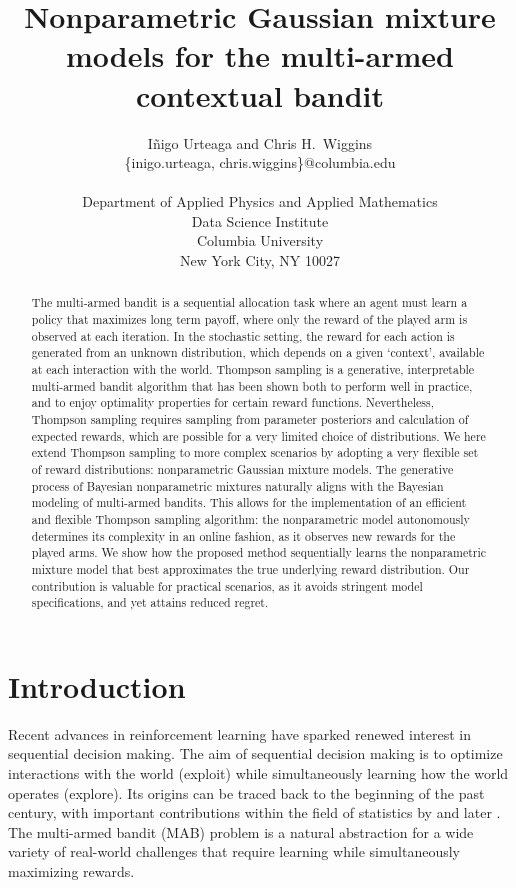 \documentclass{article}
\title{Nonparametric Gaussian mixture models for the multi-armed contextual bandit}
\author{ I\~{n}igo Urteaga and Chris H.~Wiggins\\
	{\sf \{inigo.urteaga, chris.wiggins\}@columbia.edu} \\\\
	Department of	Applied Physics and Applied Mathematics\\
	Data Science Institute\\
	Columbia University\\
	New York City, NY 10027
}
\begin{document}
\maketitle

\begin{abstract}
The multi-armed bandit is a sequential allocation task where an agent must learn a policy that maximizes long term payoff, where only the reward of the played arm is observed at each iteration. In the stochastic setting, the reward for each action is generated from an unknown distribution, which depends on a given `context', available at each interaction with the world. Thompson sampling is a generative, interpretable multi-armed bandit algorithm that has been shown both to perform well in practice, and to enjoy optimality properties for certain reward functions. Nevertheless, Thompson sampling requires sampling from parameter posteriors and calculation of expected rewards, which are possible for a very limited choice of distributions. We here extend Thompson sampling to more complex scenarios by adopting a very flexible set of reward distributions: nonparametric Gaussian mixture models. The generative process of Bayesian nonparametric mixtures naturally aligns with the Bayesian modeling of multi-armed bandits. This allows for the implementation of an efficient and flexible Thompson sampling algorithm: the nonparametric model autonomously determines its complexity in an online fashion, as it observes new rewards for the played arms. We show how the proposed method sequentially learns the nonparametric mixture model that best approximates the true underlying reward distribution. Our contribution is valuable for practical scenarios, as it avoids stringent model specifications, and yet attains reduced regret.
\end{abstract}

\section{Introduction}
\label{sec:introduction}

Recent advances in reinforcement learning \cite{j-Gosavi2009} have sparked renewed interest in sequential decision making. The aim of sequential decision making is to optimize interactions with the world (exploit) while simultaneously learning how the world operates (explore). Its origins can be traced back to the beginning of the past century, with important contributions within the field of statistics by \citet{j-Thompson1935} and later \citet{j-Robbins1952}. The multi-armed bandit (MAB) problem is a natural abstraction for a wide variety of real-world challenges that require learning while simultaneously maximizing rewards.
\end{document}
